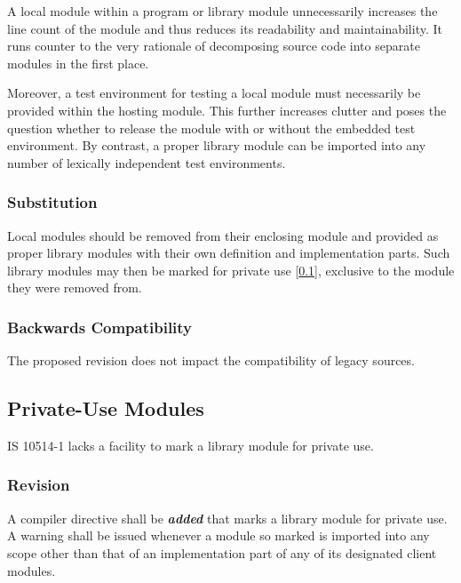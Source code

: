 \documentclass[10pt,a4paper,leqno,fleqn]{article}
\renewcommand{\emph}[1]{\textbf{\textit{#1}}}
\begin{document}
A local module within a program or library module unnecessarily increases
the line count of the module and thus reduces its readability and maintainability.
It runs counter to the very rationale of decomposing source
code into separate modules in the first place.

Moreover, a test environment for testing a local module must necessarily be
provided within the hosting module.  This further increases clutter and poses
the question whether to release the module with or without the embedded test
environment. By contrast, a proper library module can be imported into any
number of lexically independent test environments.

\subsubsection{Substitution}
Local modules should be removed from their enclosing module and provided as
proper library modules with their own definition and implementation parts. Such
library modules may then be marked for private use [\ref{PrivMod}], exclusive to
the module they were removed from.

\subsubsection{Backwards Compatibility}

The proposed revision does not impact the compatibility of legacy sources.


\subsection{Private-Use Modules}
\label{PrivMod}

IS 10514-1 lacks a facility to mark a library module for private use.

\subsubsection{Revision}

A \gls{compiler directive} shall be \emph{added} that marks a library module
for private use. A warning shall be issued whenever a module so marked is
imported into any scope other than that of an implementation part of any of
its designated client modules.
\end{document}
